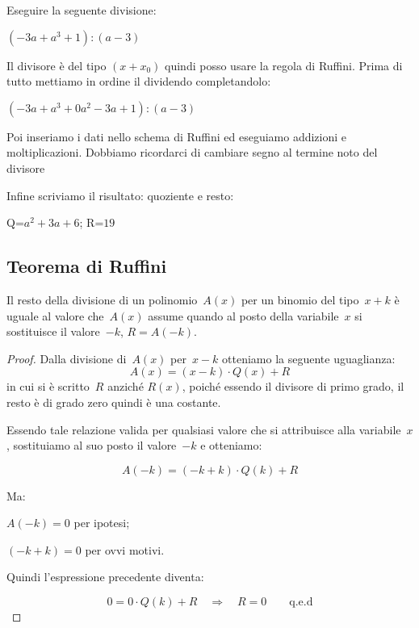  \begin{esempio}
Eseguire la seguente divisione:
 
\(\left(-3a+a^{3}+1\right):(a-3)\)

Il divisore è del tipo \((x + x_0)\) quindi posso usare la regola di Ruffini.
Prima di tutto mettiamo in ordine il dividendo completandolo:

\(\left(-3a+a^{3}+0a^2-3a+1\right):(a-3)\)

Poi inseriamo i dati nello schema di Ruffini ed eseguiamo addizioni e 
moltiplicazioni. Dobbiamo ricordarci di cambiare segno al termine noto del 
divisore

\begin{inaccessibleblock}
\begin{center}
% 
\ruffinie
\end{center}
\end{inaccessibleblock}

Infine scriviamo il risultato: quoziente e resto:

Q=\(a^2+3a+6\); \quad R=\(19\)
\end{esempio}

\subsection{Teorema di Ruffini}
\label{subsec:divpol_teorema_ruffini}

\begin{teorema}
 Il resto della divisione di un polinomio~\(A(x)\) per un
binomio del tipo~\(x+k\) è uguale al valore che~\(A(x)\) assume quando
al posto della variabile~\(x\) si sostituisce il valore~\(-k\), \(R=A(-k)\).
\end{teorema}

\begin{proof}
 Dalla divisione di~\(A(x)\) per~\(x-k\) otteniamo la seguente
uguaglianza:
\[A(x)=(x-k)\cdot Q(x)+R\]
in cui si è scritto~\(R\) anziché \(R(x)\), poiché essendo il divisore di primo 
grado, il resto è di grado zero quindi è una costante.

Essendo tale relazione valida per qualsiasi valore che si attribuisce
alla variabile~\(x\), sostituiamo al suo posto il valore~\(-k\) e otteniamo:

\[A(-k)=(-k+k) \cdot Q(k)+R\]

Ma:

\begin{itemize*}
 \item \(A(-k)=0\) per ipotesi;
 \item \((-k+k)=0\) per ovvi motivi.
\end{itemize*}

Quindi l'espressione precedente diventa:

\[0=0 \cdot Q(k)+R \quad \Longrightarrow \quad R=0 \qquad \text{q.e.d}\]

\end{proof}

